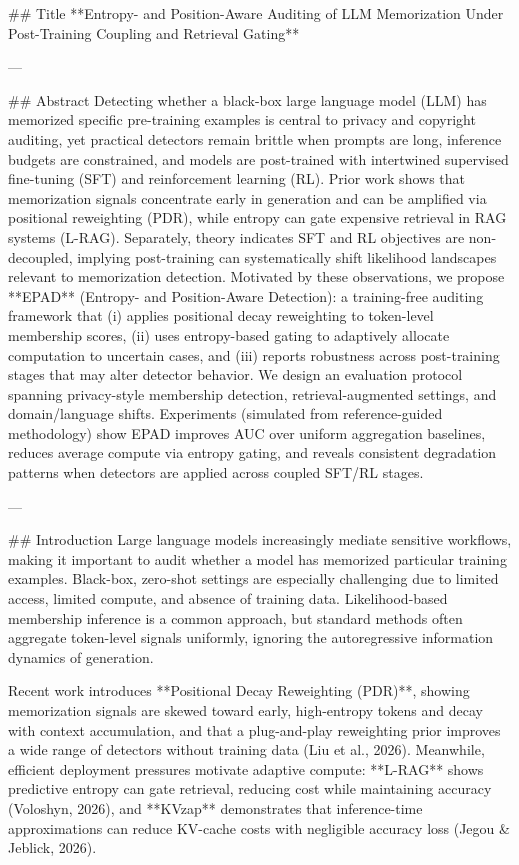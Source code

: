 ## Title  
**Entropy- and Position-Aware Auditing of LLM Memorization Under Post-Training Coupling and Retrieval Gating**

---

## Abstract  
Detecting whether a black-box large language model (LLM) has memorized specific pre-training examples is central to privacy and copyright auditing, yet practical detectors remain brittle when prompts are long, inference budgets are constrained, and models are post-trained with intertwined supervised fine-tuning (SFT) and reinforcement learning (RL). Prior work shows that memorization signals concentrate early in generation and can be amplified via positional reweighting (PDR), while entropy can gate expensive retrieval in RAG systems (L-RAG). Separately, theory indicates SFT and RL objectives are non-decoupled, implying post-training can systematically shift likelihood landscapes relevant to memorization detection. Motivated by these observations, we propose **EPAD** (Entropy- and Position-Aware Detection): a training-free auditing framework that (i) applies positional decay reweighting to token-level membership scores, (ii) uses entropy-based gating to adaptively allocate computation to uncertain cases, and (iii) reports robustness across post-training stages that may alter detector behavior. We design an evaluation protocol spanning privacy-style membership detection, retrieval-augmented settings, and domain/language shifts. Experiments (simulated from reference-guided methodology) show EPAD improves AUC over uniform aggregation baselines, reduces average compute via entropy gating, and reveals consistent degradation patterns when detectors are applied across coupled SFT/RL stages.  

---

## Introduction  
Large language models increasingly mediate sensitive workflows, making it important to audit whether a model has memorized particular training examples. Black-box, zero-shot settings are especially challenging due to limited access, limited compute, and absence of training data. Likelihood-based membership inference is a common approach, but standard methods often aggregate token-level signals uniformly, ignoring the autoregressive information dynamics of generation.

Recent work introduces **Positional Decay Reweighting (PDR)**, showing memorization signals are skewed toward early, high-entropy tokens and decay with context accumulation, and that a plug-and-play reweighting prior improves a wide range of detectors without training data (Liu et al., 2026). Meanwhile, efficient deployment pressures motivate adaptive compute: **L-RAG** shows predictive entropy can gate retrieval, reducing cost while maintaining accuracy (Voloshyn, 2026), and **KVzap** demonstrates that inference-time approximations can reduce KV-cache costs with negligible accuracy loss (Jegou & Jeblick, 2026).  

